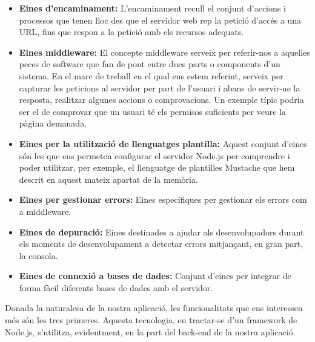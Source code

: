     \begin{itemize}
        \item \textbf{Eines d'encaminament:} L'encaminament recull el conjunt d'accions i processos que tenen lloc des que el servidor web rep la petició d'accés a una URL, fins que respon a la petició amb els recursos adequats.
        \item \textbf{Eines middleware:} El concepte middleware serveix per referir-nos a aquelles peces de software que fan de pont entre dues parts o components d'un sistema. En el marc de treball en el qual ens estem referint, serveix per capturar les peticions al servidor per part de l'usuari i abans de servir-ne la resposta, realitzar algunes accions o comprovacions. Un exemple típic podria ser el de comprovar que un usuari té els permisos suficients per veure la pàgina demanada.
        \item \textbf{Eines per la utilització de llenguatges plantilla:} Aquest conjunt d'eines són les que ens permeten configurar el servidor Node.js per comprendre i poder utilitzar, per exemple, el llenguatge de plantilles Mustache que hem descrit en aquest mateix apartat de la memòria.
        \item \textbf{Eines per gestionar errors:} Eines específiques per gestionar els errors com a middleware.
        \item \textbf{Eines de depuració:} Eines destinades a ajudar als desenvolupadors durant els moments de desenvolupament a detectar errors mitjançant, en gran part, la consola.
        \item \textbf{Eines de connexió a bases de dades:} Conjunt d'eines per integrar de forma fàcil diferents bases de dades amb el servidor.
    \end{itemize}

    Donada la naturalesa de la nostra aplicació, les funcionalitats que ens interessen més són les tres primeres. Aquesta tecnologia, en tractar-se d'un framework de Node.js, s'utilitza, evidentment, en la part del back-end de la nostra aplicació.
